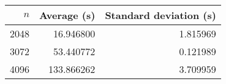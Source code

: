 \begin{tabular}{rrr}
$n$ & Average (s) & Standard deviation (s)\\\hline
2048 & 16.946800 & 1.815969\\
3072 & 53.440772 & 0.121989\\
4096 & 133.866262 & 3.709959\\
\end{tabular}
